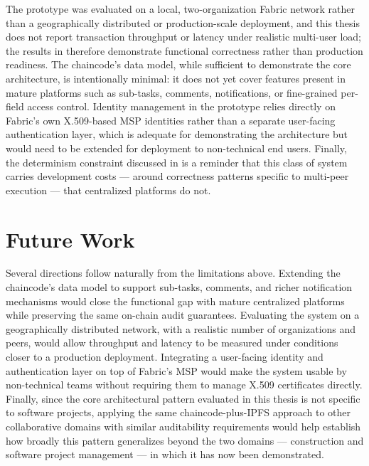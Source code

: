 The prototype was evaluated on a local, two-organization Fabric network rather than a geographically distributed or production-scale deployment, and this thesis does not report transaction throughput or latency under realistic multi-user load; the results in  therefore demonstrate functional correctness rather than production readiness. The chaincode's data model, while sufficient to demonstrate the core architecture, is intentionally minimal: it does not yet cover features present in mature platforms such as sub-tasks, comments, notifications, or fine-grained per-field access control. Identity management in the prototype relies directly on Fabric's own X.509-based MSP identities rather than a separate user-facing authentication layer, which is adequate for demonstrating the architecture but would need to be extended for deployment to non-technical end users. Finally, the determinism constraint discussed in  is a reminder that this class of system carries development costs — around correctness patterns specific to multi-peer execution — that centralized platforms do not.

\section{Future Work}
\label{sec:future-work}

Several directions follow naturally from the limitations above. Extending the chaincode's data model to support sub-tasks, comments, and richer notification mechanisms would close the functional gap with mature centralized platforms while preserving the same on-chain audit guarantees. Evaluating the system on a geographically distributed network, with a realistic number of organizations and peers, would allow throughput and latency to be measured under conditions closer to a production deployment. Integrating a user-facing identity and authentication layer on top of Fabric's MSP would make the system usable by non-technical teams without requiring them to manage X.509 certificates directly. Finally, since the core architectural pattern evaluated in this thesis is not specific to software projects, applying the same chaincode-plus-IPFS approach to other collaborative domains with similar auditability requirements would help establish how broadly this pattern generalizes beyond the two domains — construction and software project management — in which it has now been demonstrated.
